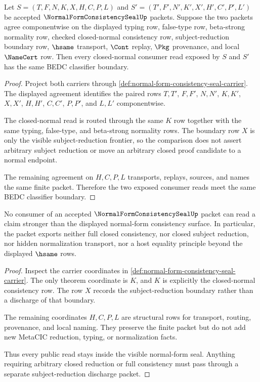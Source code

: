 \begin{theorem}
\label{thm:normal-form-consistency-seal-finite-window-determinacy}
Let $S=(T,F,N,K,X,H,C,P,L)$ and $S'=(T',F',N',K',X',H',C',P',L')$ be accepted
$\NormalFormConsistencySealUp$ packets. Suppose the two packets agree
componentwise on the displayed typing row, false-type row, beta-strong
normality row, checked closed-normal consistency row, subject-reduction
boundary row, $\hsame$ transport, $\Cont$ replay, $\Pkg$ provenance, and local
$\NameCert$ row. Then every closed-normal consumer read exposed by $S$ and
$S'$ has the same BEDC classifier boundary.
\end{theorem}
\begin{proof}
Project both carriers through
\autoref{def:normal-form-consistency-seal-carrier}. The displayed agreement
identifies the paired rows $T,T'$, $F,F'$, $N,N'$, $K,K'$, $X,X'$, $H,H'$,
$C,C'$, $P,P'$, and $L,L'$ componentwise.

The closed-normal read is routed through the same $K$ row together with the
same typing, false-type, and beta-strong normality rows. The boundary row $X$
is only the visible subject-reduction frontier, so the comparison does not
assert arbitrary subject reduction or move an arbitrary closed proof candidate
to a normal endpoint.

The remaining agreement on $H,C,P,L$ transports, replays, sources, and names
the same finite packet. Therefore the two exposed consumer reads meet the same
BEDC classifier boundary.
\end{proof}

\begin{theorem}
\label{thm:normal-form-consistency-seal-nonescape}
No consumer of an accepted $\NormalFormConsistencySealUp$ packet can read a
claim stronger than the displayed normal-form consistency surface. In
particular, the packet exports neither full closed consistency, nor closed
subject reduction, nor hidden normalization transport, nor a host equality
principle beyond the displayed $\hsame$ rows.
\end{theorem}
\begin{proof}
Inspect the carrier coordinates in
\autoref{def:normal-form-consistency-seal-carrier}. The only theorem coordinate
is $K$, and $K$ is explicitly the closed-normal consistency row. The row $X$
records the subject-reduction boundary rather than a discharge of that
boundary.

The remaining coordinates $H,C,P,L$ are structural rows for transport, routing,
provenance, and local naming. They preserve the finite packet but do not add
new MetaCIC reduction, typing, or normalization facts.

Thus every public read stays inside the visible normal-form seal. Anything
requiring arbitrary closed reduction or full consistency must pass through a
separate subject-reduction discharge packet.
\end{proof}

